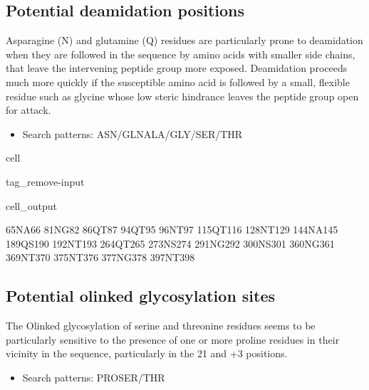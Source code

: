 \documentclass[letterpaper,10pt,english]{jupyterBook}
\begin{document}
\subsection{Potential deamidation positions}
\label{\detokenize{ipynb/chapter1:potential-deamidation-positions}}
\sphinxAtStartPar
Asparagine (N) and glutamine (Q) residues are particularly prone to deamidation when they are followed in the sequence by amino acids with smaller side chains, that leave the intervening peptide group more exposed. Deamidation proceeds much more quickly if the susceptible amino acid is followed by a small, flexible residue such as glycine whose low steric hindrance leaves the peptide group open for attack.
\begin{itemize}
\item {} 
\sphinxAtStartPar
Search patterns: ASN/GLN\sphinxhyphen{}ALA/GLY/SER/THR

\end{itemize}

\begin{sphinxuseclass}{cell}
\begin{sphinxuseclass}{tag_remove-input}\begin{sphinxVerbatimOutput}

\begin{sphinxuseclass}{cell_output}
\begin{sphinxVerbatim}[commandchars=\\\{\}]
65\PYGZhy{}NA\PYGZhy{}66
81\PYGZhy{}NG\PYGZhy{}82
86\PYGZhy{}QT\PYGZhy{}87
94\PYGZhy{}QT\PYGZhy{}95
96\PYGZhy{}NT\PYGZhy{}97
115\PYGZhy{}QT\PYGZhy{}116
128\PYGZhy{}NT\PYGZhy{}129
144\PYGZhy{}NA\PYGZhy{}145
189\PYGZhy{}QS\PYGZhy{}190
192\PYGZhy{}NT\PYGZhy{}193
264\PYGZhy{}QT\PYGZhy{}265
273\PYGZhy{}NS\PYGZhy{}274
291\PYGZhy{}NG\PYGZhy{}292
300\PYGZhy{}NS\PYGZhy{}301
360\PYGZhy{}NG\PYGZhy{}361
369\PYGZhy{}NT\PYGZhy{}370
375\PYGZhy{}NT\PYGZhy{}376
377\PYGZhy{}NG\PYGZhy{}378
397\PYGZhy{}NT\PYGZhy{}398
\end{sphinxVerbatim}

\end{sphinxuseclass}\end{sphinxVerbatimOutput}

\end{sphinxuseclass}
\end{sphinxuseclass}

\subsection{Potential o\sphinxhyphen{}linked glycosylation sites}
\label{\detokenize{ipynb/chapter1:potential-o-linked-glycosylation-sites}}
\sphinxAtStartPar
The O\sphinxhyphen{}linked glycosylation of serine and threonine residues seems to be particularly sensitive to the presence of one or more proline residues in their vicinity in the sequence, particularly in the 2\sphinxhyphen{}1 and +3 positions.
\begin{itemize}
\item {} 
\sphinxAtStartPar
Search patterns: PRO\sphinxhyphen{}SER/THR

\end{itemize}
\end{document}
